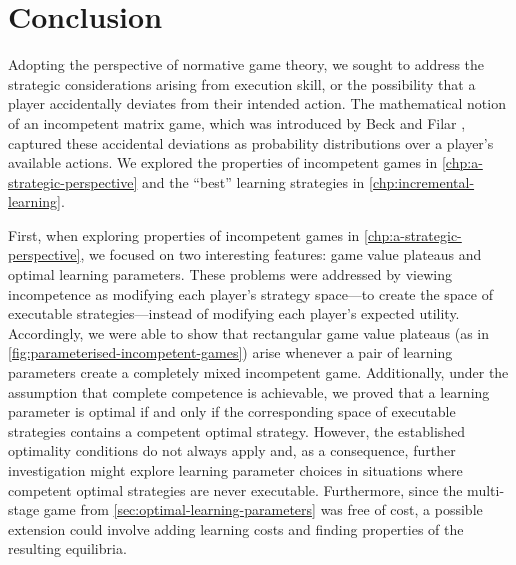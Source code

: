 
\chapter{Conclusion}
    Adopting the perspective of normative game theory, we sought to address the strategic considerations arising from execution skill, or the possibility that a player accidentally deviates from their intended action.
    The mathematical notion of an incompetent matrix game, which was introduced by Beck and Filar \parencite{Beck2007}, captured these accidental deviations as probability distributions over a player's available actions.
    We explored the properties of incompetent games in \autoref{chp:a-strategic-perspective} and the ``best'' learning strategies in \autoref{chp:incremental-learning}.

    First, when exploring properties of incompetent games in \autoref{chp:a-strategic-perspective}, we focused on two interesting features: game value plateaus and optimal learning parameters.
    These problems were addressed by viewing incompetence as modifying each player's strategy space---to create the space of executable strategies---instead of modifying each player's expected utility.
    Accordingly, we were able to show that rectangular game value plateaus (as in \autoref{fig:parameterised-incompetent-games}) arise whenever a pair of learning parameters create a completely mixed incompetent game.
    Additionally, under the assumption that complete competence is achievable, we proved that a learning parameter is optimal if and only if the corresponding space of executable strategies contains a competent optimal strategy.
    However, the established optimality conditions do not always apply and, as a consequence, further investigation might explore learning parameter choices in situations where competent optimal strategies are never executable.
    Furthermore, since the multi-stage game from \autoref{sec:optimal-learning-parameters} was free of cost, a possible extension could involve adding learning costs and finding properties of the resulting equilibria.

